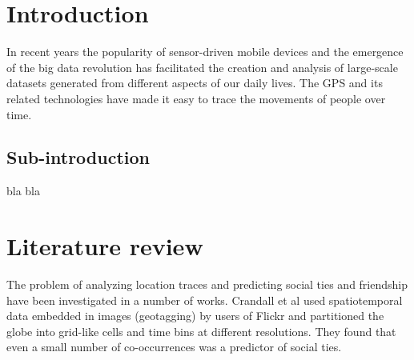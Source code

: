 \section{Introduction}
In recent years the popularity of sensor-driven mobile devices and the emergence of the big data revolution has facilitated the creation and analysis of large-scale datasets generated from different aspects of our daily lives\cite{lazer2009life}. The GPS and its related technologies have made it easy to trace the movements of people over time.

\subsection{Sub-introduction}
bla bla


\section{Literature review}
The problem of analyzing location traces and predicting social ties and friendship have been investigated in a number of works. Crandall et al\cite{ISTfGC} used spatiotemporal data embedded in images (geotagging) by users of Flickr and partitioned the globe into grid-like cells and time bins at different resolutions. They found that even a small number of co-occurrences was a predictor of social ties.





